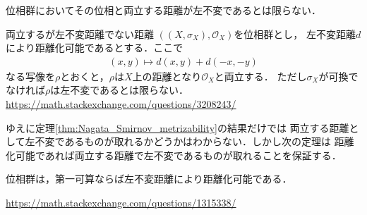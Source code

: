 	位相群においてその位相と両立する距離が左不変であるとは限らない．
	
	\begin{itembox}[l]{両立するが左不変距離でない距離}
		$\left(\left(X,\sigma_X\right),\mathscr{O}_X\right)$を位相群とし，
		左不変距離$d$により距離化可能であるとする．ここで
		\begin{align}
			(x,y) \longmapsto d(x,y) + d(-x,-y)
		\end{align}
		なる写像を$\rho$とおくと，$\rho$は$X$上の距離となり$\mathscr{O}_X$と両立する．
		ただし$\sigma_X$が可換でなければ$\rho$は左不変であるとは限らない．
		\url{https://math.stackexchange.com/questions/3208243/}
	\end{itembox}
	
	ゆえに定理\ref{thm:Nagata_Smirnov_metrizability}の結果だけでは
	両立する距離として左不変であるものが取れるかどうかはわからない．しかし次の定理は
	距離化可能であれば両立する距離で左不変であるものが取れることを保証する．
	
	\begin{screen}
		\begin{thm}
			位相群は，第一可算ならば左不変距離により距離化可能である．
		\end{thm}
	\end{screen}
	
	\url{https://math.stackexchange.com/questions/1315338/}
	